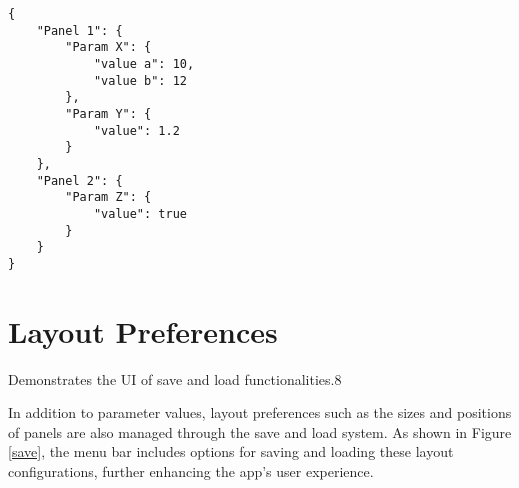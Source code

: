 \begin{verbatim}
{
    "Panel 1": {
        "Param X": {
            "value a": 10,
            "value b": 12
        },
        "Param Y": {
            "value": 1.2
        }
    },
    "Panel 2": {
        "Param Z": {
            "value": true
        }
    }
}
\end{verbatim}


\section{Layout Preferences}

{Demonstrates the UI of save and load functionalities.}{8}

In addition to parameter values, layout preferences such as the sizes and positions of panels are also managed through the save and load system. As shown in Figure \ref{save}, the menu bar includes options for saving and loading these layout configurations, further enhancing the app’s user experience.
